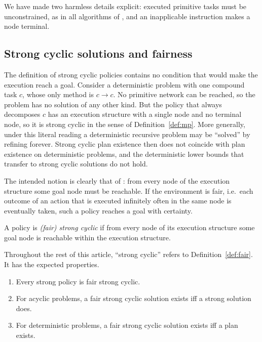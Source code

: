 We have made two harmless details explicit: executed primitive tasks must be unconstrained, as
in all algorithms of \CBb{}, and an inapplicable instruction makes a node terminal.

\subsection{Strong cyclic solutions and fairness}\label{sec:sc}

The definition of strong cyclic policies contains no condition that would make the execution
reach a goal. Consider a deterministic problem with one compound task $c$, whose only method is
$c\to c$. No primitive network can be reached, so the problem has no solution of any other kind.
But the policy that always decomposes $c$ has an execution structure with a single node and no
terminal node, so it is strong cyclic in the sense of Definition~\ref{def:mp}. More generally,
under this literal reading a deterministic recursive problem may be ``solved'' by refining
forever. Strong cyclic plan existence then does not coincide with plan existence on deterministic
problems, and the deterministic lower bounds that \CBb{} transfer to strong cyclic solutions do
not hold.

The intended notion is clearly that of \textcite{cimatti:et:al:aij-03}: from every node of the
execution structure some goal node must be reachable. If the environment is fair, i.e.\ each
outcome of an action that is executed infinitely often in the same node is eventually taken, such
a policy reaches a goal with certainty.

\begin{definition}\label{def:fair}
  A policy is \emph{(fair) strong cyclic} if from every node of its execution structure some goal
  node is reachable within the execution structure.
\end{definition}

Throughout the rest of this article, ``strong cyclic'' refers to Definition~\ref{def:fair}. It
has the expected properties.

\begin{proposition}\label{prop:fair-basic}
  \begin{enumerate}[label=(\roman*)]
    \item Every strong policy is fair strong cyclic.
    \item For acyclic problems, a fair strong cyclic solution exists iff a strong solution does.
    \item For deterministic problems, a fair strong cyclic solution exists iff a plan exists.
  \end{enumerate}
\end{proposition}

